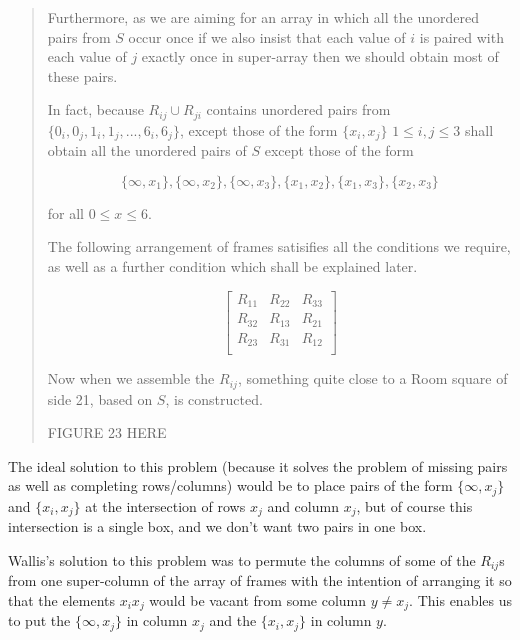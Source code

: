 \documentclass[
  11pt,
  a4paper]{book}
\begin{document}
\begin{quote}
Furthermore, as we are aiming for an array in which all the
unordered pairs from $S$ occur once if we also insist that
each value of $i$ is paired with each value of $j$ exactly
once in super-array then we should obtain most of these
pairs.

In fact, because $R_{ij} \cup R_{ji}$ contains
unordered pairs from $\{0_i,0_j,1_i,1_j,...,6_i,6_j\}$,
except those of the form $\{x_i,x_j\}$ $1 \leq i,j \leq 3$
shall obtain all the unordered pairs of $S$ except those of
the form

\begin{equation}
\{\infty, x_1\}, \{\infty, x_2\}, \{\infty, x_3\}, \{x_1, x_2\}, \{x_1, x_3\}, \{x_2, x_3\}
\end{equation}

for all $0 \leq x \leq 6$.

The following arrangement of frames satisifies all the
conditions we require, as well as a further condition which
shall be explained later.

\begin{equation}
  \begin{bmatrix}
    R_{11} & R_{22} & R_{33} \\
    R_{32} & R_{13} & R_{21} \\
    R_{23} & R_{31} & R_{12} \\
  \end{bmatrix}
\end{equation}

Now when we assemble the $R_{ij}$, something quite close to
a Room square of side 21, based on $S$, is constructed.

FIGURE 23 HERE

 \end{quote}

The ideal solution to this problem
(because it solves the problem of missing pairs as well as
completing rows/columns) would be to place pairs of the form
\(\{\infty, x_j\}\) and \(\{x_i, x_j\}\) at the intersection of
rows \(x_j\) and column \(x_j\), but of course this intersection
is a single box, and we don't want two pairs in one box.

Wallis's solution to this problem was to permute the columns
of some of the \(R_{ij}\)s from one super-column of the array
of frames with the intention of arranging it so that the
elements \(x_i x_j\) would be vacant from some column
\(y \neq x_j\). This enables us to put the \(\{\infty, x_j\}\) in
column \(x_j\) and the \(\{x_i,x_j\}\) in column \(y\).
\end{document}
